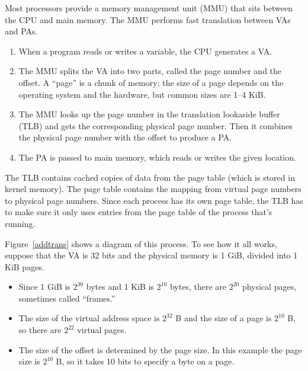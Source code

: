 \documentclass[12pt]{book}
\begin{document}
{Most processors provide a memory management unit (MMU) that sits between the CPU and main memory.  The MMU performs fast translation between VAs and PAs.

\begin{enumerate}

\item When a program reads or writes a variable, the CPU generates a
VA.  

\item The MMU splits the VA into two parts, called the page number and
the offset.  A ``page'' is a chunk of memory; the size of a page
depends on the operating system and the hardware, but common sizes
are 1--4 KiB.

\item The MMU looks up the page number in the translation lookaside buffer (TLB) and gets the corresponding physical page number.  Then it combines
the physical page number with the offset to produce a PA.

\item The PA is passed to main memory, which reads or writes the given
location.

\end{enumerate}

The TLB contains cached copies of data from the page table (which is stored in kernel memory).  The page table contains the mapping from virtual page numbers to physical page numbers.  Since each process has its own page table, the TLB has to make sure it only uses entries from the page table of the process that's running.

Figure~\ref{addtrans} shows a diagram of this process.
To see how it all works, suppose that the VA is 32 bits and the physical memory is 1 GiB, divided into 1 KiB pages.

\begin{itemize}

\item Since 1 GiB is $2^{30}$ bytes and 1 KiB is $2^{10}$ bytes, there
  are $2^{20}$ physical pages, sometimes called ``frames.''

\item The size of the virtual address space is $2^{32}$ B and the size
  of a page is $2^{10}$ B, so there are $2^{22}$ virtual pages.

\item The size of the offset is determined by the page size.  In this
  example the page size is $2^{10}$ B, so it takes 10 bits to specify
  a byte on a page.


\end{itemize}}
\end{document}
